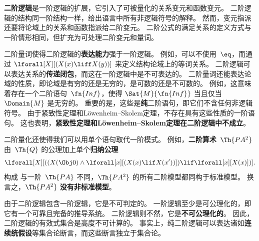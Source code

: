 \textbf{二阶逻辑}是一阶逻辑的扩展，它引入了可被量化的关系变元和函数变元。
二阶逻辑的结构同一阶结构一样，给出语言中所有非逻辑符号的解释。
然而，变元指派还要将论域上的关系和函数指派给二阶变元。
二阶公式的满足关系的定义方式与一阶情形相同，但扩充为可处理二阶变元和量词。

二阶量词使得二阶逻辑的\textbf{表达能力}强于一阶逻辑。
例如，可以不使用~$\eq$，而通过 $\lforall[X][(X(x) \liff X(y))]$ 来定义结构论域上的等词关系。
二阶逻辑可以表达关系的\textbf{传递闭包}，而这在一阶逻辑中是不可表达的。
二阶量词还能表达论域的性质，即论域是有穷的还是无穷的，是可数的还是不可数的。
例如，这意味着存在一个二阶语句~$\fn{Inf}$，使得 $\Sat{M}{\fn{Inf}}$ 当且仅当 $\Domain{M}$ 是无穷的。
重要的是，这些是\textbf{纯}二阶语句，即它们不含任何非逻辑符号。
由于紧致性定理和Löwenheim--Skolem定理，不存在具有这些性质的一阶语句。
这也表明，\textbf{紧致性定理和Löwenheim--Skolem定理在二阶逻辑中不成立}。

二阶量化还使得我们可以用单个语句取代一阶模式。
例如，\textbf{二阶算术}~$\Th{PA^2}$ 由~$\Th{Q}$ 的公理加上单个\textbf{归纳公理}\[
\lforall[X][((X(\Obj 0) \land \lforall[x][(X(x) \lif X(x'))]) \lif
  \lforall[x][X(x)])].
\]构成
与一阶~$\Th{PA}$ 不同，$\Th{PA^2}$ 的所有二阶模型都同构于标准模型。
换言之，$\Th{PA^2}$ \textbf{没有非标准模型}。

由于二阶逻辑包含一阶逻辑，它是不可判定的。
一阶逻辑至少是可公理化的，即它有一个可靠且完备的推导系统。
二阶逻辑则不然，它是\textbf{不可公理化的}。
因此，二阶逻辑的有效式集合是高度不可计算的。
事实上，纯二阶逻辑可以表达诸如\textbf{连续统假设}等集合论断言，而这些断言独立于集合论。